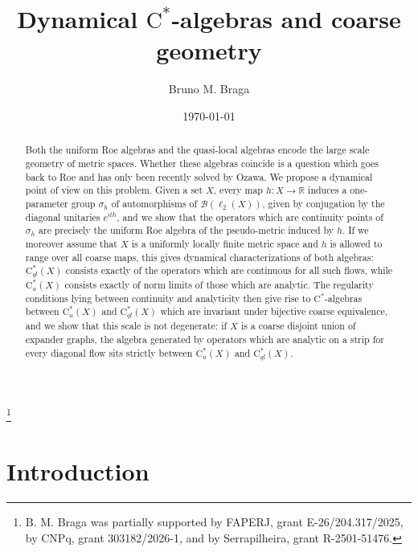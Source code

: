 \documentclass[11pt]{amsart}
\newcommand{\cstu}{\mathrm{C}^*_u}
\newcommand{\cstql}{\mathrm{C}^*_{\textit{ql}}}
\newcommand{\cstar}{$\mathrm{C}^*$}
\numberwithin{equation}{section}
\theoremstyle{definition}
\theoremstyle{remark}
\begin{document}
\title[Dynamical \cstar-algebras and coarse geometry]{Dynamical \cstar-algebras and coarse geometry}%

\date{\today} %

 

\author[B. M. Braga]{Bruno M. Braga}
\address[B. M. Braga]{IMPA, Estrada Dona Castorina 110, 22460-320, Rio de Janeiro, Brazil}
\thanks {B. M. Braga  was partially supported by FAPERJ, grant E-26/204.317/2025,  by CNPq, grant 303182/2026-1, and by Serrapilheira, grant R-2501-51476.}

\begin{abstract}
Both  the uniform Roe algebras and the quasi-local algebras   encode the large scale geometry of metric spaces. Whether these algebras  coincide is a question which goes back to Roe and has only been recently solved by Ozawa. We propose a dynamical point of view on this problem. Given a set $X$, every map $h\colon X\to\mathbb{R}$ induces a one-parameter group $\sigma_h$ of automorphisms of $\mathcal{B}(\ell_2(X))$, given by conjugation by the diagonal unitaries $e^{ith}$, and we show that the operators which are continuity points of $\sigma_h$ are precisely the uniform Roe algebra of the pseudo-metric induced by $h$. If we moreover assume that $X$ is a uniformly locally finite metric space and $h$ is allowed to range over all coarse maps, this gives dynamical characterizations of both algebras: $\cstql(X)$ consists exactly of the operators which are continuous for all such flows, while $\cstu(X)$ consists exactly of norm limits of those which are analytic. The regularity conditions lying between continuity and analyticity then give rise to   \cstar-algebras between $\cstu(X)$ and $\cstql(X)$ which are invariant under bijective coarse equivalence, and we show that this scale is not degenerate: if $X$ is a coarse disjoint union of expander graphs, the algebra generated by operators which are analytic on a strip for every diagonal flow sits strictly between $\cstu(X)$ and $\cstql(X)$.
\end{abstract}
\maketitle




\section{Introduction}
\end{document}

